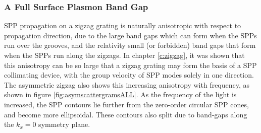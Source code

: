 
\subsubsection{A Full Surface Plasmon Band Gap}
SPP propagation on a zigzag grating is naturally anisotropic with respect to propagation direction, due to the large band gaps which can form when the SPPs run over the grooves, and the relativity small (or forbidden) band gaps that form when the SPPs run along the zigzags. In chapter \ref{c:zigzag}, it was shown that this anisotropy can be so large that a zigzag grating may form the basis of a SPP collimating device, with the group velocity of SPP modes solely in one direction.
The asymmetric zigzag also shows this increasing anisotropy with frequency, as shown in figure \ref{fig:asymscattergramsALL}. As the frequency of the light is increased, the SPP contours lie further from the zero-order circular SPP cones, and become more ellipsoidal. These contours also split due to band-gaps along the $k_x=0$ symmetry plane.

